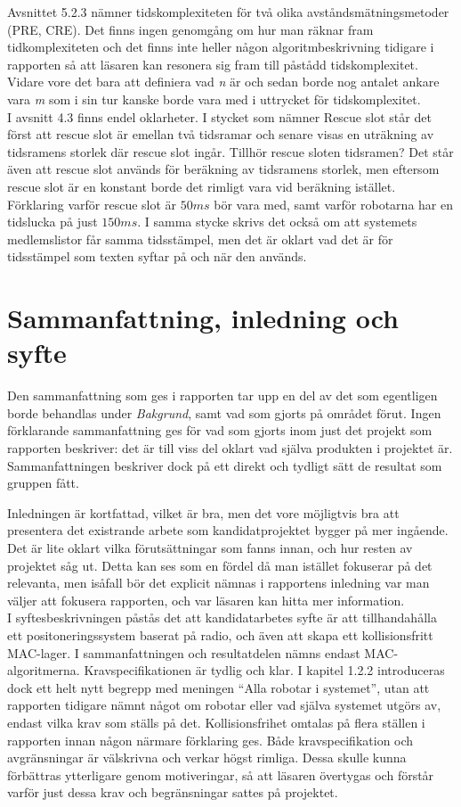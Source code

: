 \documentclass[a4paper,11pt]{article}
\begin{document}
Avsnittet 5.2.3 nämner tidskomplexiteten för två olika avståndsmätningsmetoder (PRE, CRE). Det finns ingen genomgång om hur man räknar fram tidkomplexiteten och det finns inte heller någon algoritmbeskrivning tidigare i rapporten så att läsaren kan resonera sig fram till påstådd tidskomplexitet. Vidare vore det bara att definiera vad \emph{n} är och sedan borde nog antalet ankare vara \emph{m} som i sin tur kanske borde vara med i uttrycket för tidskomplexitet. \\

I avsnitt 4.3 finns endel oklarheter. I stycket som nämner Rescue slot står det först att rescue slot är emellan två tidsramar och senare visas en uträkning av tidsramens storlek där rescue slot ingår. Tillhör rescue sloten tidsramen? Det står även att rescue slot används för beräkning av tidsramens storlek, men eftersom rescue slot är en konstant borde det rimligt vara vid beräkning istället. Förklaring varför rescue slot är $50 ms$ bör vara med, samt varför robotarna har en tidslucka på just $150 ms$. I samma stycke skrivs det också om att systemets medlemslistor får samma tidsstämpel, men det är oklart vad det är för tidsstämpel som texten syftar på och när den används.

\section{Sammanfattning, inledning och syfte}
Den sammanfattning som ges i rapporten tar upp en del av det som egentligen borde behandlas under \emph{Bakgrund}, samt vad som gjorts på området förut. Ingen förklarande sammanfattning ges för vad som gjorts inom just det projekt som rapporten beskriver: det är till viss del oklart vad själva produkten i projektet är. Sammanfattningen beskriver dock på ett direkt och tydligt sätt de resultat som gruppen fått.

Inledningen är kortfattad, vilket är bra, men det vore möjligtvis bra att presentera det existrande arbete som kandidatprojektet bygger på mer ingående. Det är lite oklart vilka förutsättningar som fanns innan, och hur resten av projektet såg ut. Detta kan ses som en fördel då man istället fokuserar på det relevanta, men isåfall bör det explicit nämnas i rapportens inledning var man väljer att fokusera rapporten, och var läsaren kan hitta mer information. \\

I syftesbeskrivningen påstås det att kandidatarbetes syfte är att tillhandahålla ett positoneringssystem baserat på radio, och även att skapa ett kollisionsfritt MAC-lager. I sammanfattningen och resultatdelen nämns endast MAC-algoritmerna. Kravspecifikationen är tydlig och klar. I kapitel 1.2.2 introduceras dock ett helt nytt begrepp med meningen “Alla robotar i systemet”, utan att rapporten tidigare nämnt något om robotar eller vad själva systemet utgörs av, endast vilka krav som ställs på det. Kollisionsfrihet omtalas på flera ställen i rapporten innan någon närmare förklaring ges. Både kravspecifikation och avgränsningar är välskrivna och verkar högst rimliga. Dessa skulle kunna förbättras ytterligare genom motiveringar, så att läsaren övertygas och förstår varför just dessa krav och begränsningar sattes på projektet. \\ 
\end{document}
